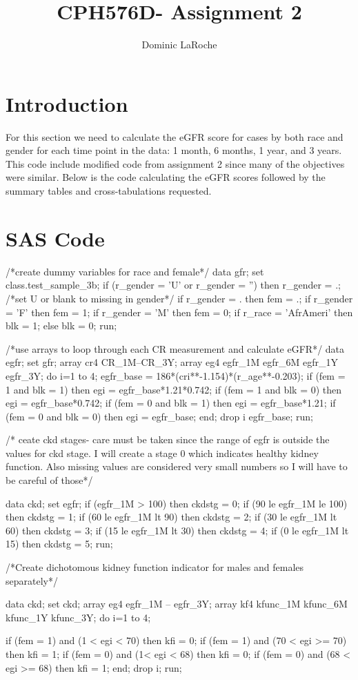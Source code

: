 \documentclass{article}\usepackage[]{graphicx}\usepackage[]{color}
\title{CPH576D- Assignment 2}
\author{Dominic LaRoche}
\begin{document}
\maketitle

\section{Introduction}
For this section we need to calculate the eGFR score for cases by both race and gender for each time point in the data: 1 month, 6 months, 1 year, and 3 years.  This code include modified code from assignment 2 since many of the objectives were similar.  Below is the code calculating the eGFR scores followed by the summary tables and cross-tabulations requested.\\ 

\section{SAS Code}


\begin{Datastep}
/*create dummy variables for race and female*/
data gfr;
set class.test_sample_3b;
if (r_gender = 'U' or r_gender = '') then r_gender = .; /*set U or blank to missing in gender*/
if r_gender = . then fem = .;
if r_gender = 'F' then fem = 1;
if r_gender = 'M' then fem = 0; 
if r_race = 'AfrAmeri' then blk = 1;
  else blk = 0;
run;

/*use arrays to loop through each CR measurement
and calculate eGFR*/
data egfr;
set gfr;
array cr{4} CR_1M--CR_3Y;
array eg{4} egfr_1M egfr_6M egfr_1Y egfr_3Y;
do i=1 to 4;
	egfr_base = 186*(cr{i}**-1.154)*(r_age**-0.203);
	if (fem = 1 and blk = 1) then eg{i} = egfr_base*1.21*0.742;
	if (fem = 1 and blk = 0) then eg{i} = egfr_base*0.742;
	if (fem = 0 and blk = 1) then eg{i} = egfr_base*1.21;
	if (fem = 0 and blk = 0) then eg{i} = egfr_base;
	end;
drop i egfr_base;
run;


/* ceate ckd stages- care must be taken since the range of egfr 
is outside the values for ckd stage.  
I will create a stage 0 which indicates healthy kidney function. 
Also missing values are considered very 
small numbers so I will have to be careful of those*/

data ckd;
set egfr;
if (egfr_1M > 100) then ckdstg = 0;
if (90 le egfr_1M le 100) then ckdstg = 1;
if (60 le egfr_1M lt 90) then ckdstg = 2;
if (30 le egfr_1M lt 60) then ckdstg = 3;
if (15 le egfr_1M lt 30) then ckdstg = 4;
if (0 le egfr_1M lt 15) then ckdstg = 5;
run;

/*Create dichotomous kidney function indicator
for males and females separately*/

data ckd;
set ckd;
array eg{4} egfr_1M -- egfr_3Y;
array kf{4} kfunc_1M kfunc_6M kfunc_1Y kfunc_3Y;
do i=1 to 4;
	
	if (fem = 1) and (1 < eg{i} < 70) then kf{i} = 0;
	if (fem = 1) and (70 < eg{i} >= 70) then kf{i} = 1;
	if (fem = 0) and (1< eg{i} < 68) then kf{i} = 0;
	if (fem = 0) and (68 < eg{i} >= 68) then kf{i} = 1;
end;
drop i;
run;
\end{Datastep}
\end{document}
